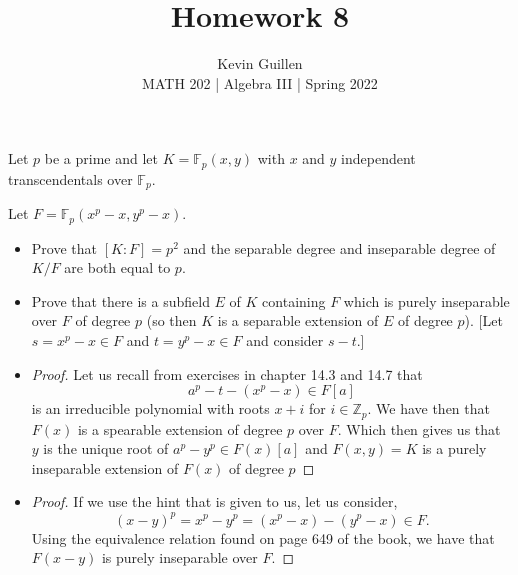 \documentclass[11pt]{article}
\newenvironment{problem}[2][Problem\!]{\begin{tcolorbox}\begin{trivlist}
\item[\hskip \labelsep {\bfseries #1}\hskip \labelsep {\bfseries #2}]}{\end{trivlist}\end{tcolorbox}}
\newcommand{\zz}{\mathbb Z}   %
\newcommand{\ff}{\mathbb F}   %
\begin{document}
 
\title{Homework 8}
\author{Kevin Guillen\\[0.5em]
MATH 202  | Algebra III | Spring 2022}
\date{} 
\maketitle


\begin{problem} {14.9.2}
    Let $p$ be a prime and let $K = \ff_p(x,y)$ with $x$ and $y$ independent transcendentals over $\ff_p$. 

    Let $F = \ff_p(x^{p}- x, y^{p} - x)$.
    \begin{itemize}
        \item[(a)] Prove that $[K:F] = p^{2}$ and the separable degree and inseparable degree of $K/F$ are both equal to $p$.
        \item[(b)] Prove that there is a subfield $E$ of $K$ containing $F$ which is purely inseparable over $F$ of degree $p$ (so then $K$ is a separable extension of $E$ of degree $p$). [Let $s = x^{p}-x\in F$ and $t = y^{p}-x\in F$ and consider $s -t$.]
    \end{itemize}
\end{problem}
\begin{itemize}
    \item[(a)]
    \begin{proof} 
        Let us recall from exercises in chapter 14.3 and 14.7 that \[a^{p} -t -(x^{p} -x)\in F[a]\] is an irreducible polynomial with roots $x + i$ for $i\in \zz_p$. We have then that $F(x)$ is a spearable extension of degree $p$ over $F$. Which then gives us that $y$ is the unique root of $a^{p} - y^{p}\in F(x)[a]$ and $F(x,y) = K$ is a purely inseparable extension of $F(x)$ of degree $p$
    \end{proof}
    \item[(b)]
    \begin{proof}
        If we use the hint that is given to us, let us consider, 
        \[(x-y)^{p} = x^{p} - y^{p} = (x^{p} -x) - (y^{p} -x)\in F.\]
        Using the equivalence relation found on page 649 of the book, we have that $F(x-y)$ is purely inseparable over $F$.
    \end{proof}  
\end{itemize}

\vspace*{15pt}
\end{document}
